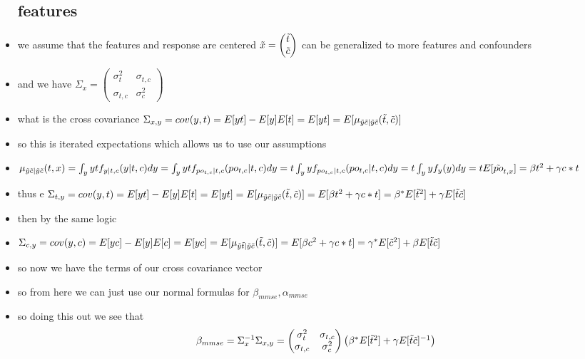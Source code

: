 \documentclass{article}
\begin{document}
\begin{itemize}
\subsection*{features}
\item we assume that the features and response are centered $\Tilde{x}=\begin{pmatrix}
    \Tilde{t}\\\Tilde{c}
\end{pmatrix}$ can be generalized to more features and confounders
\item and we have $\Sigma_{x}=\begin{pmatrix}
    \sigma^2_{t} & \sigma_{t,c}\\ \sigma_{t,c} & \sigma^2_{c}
\end{pmatrix}$
\item what is the cross covariance $\Sigma_{x,y}=cov(y,t)=E[yt]-E[y]E[t]=E[yt]=E[\mu_{\Tilde{y}\Tilde{c}|\Tilde{y}\Tilde{c}}(\Tilde{t},\Tilde{c})]$
\item so this is iterated expectations which allows us to use our assumptions
\item $\mu_{\Tilde{y}\Tilde{c}|\Tilde{y}\Tilde{c}}(t,x)=\int_y ytf_{y|t,c}(y|t,c)dy=\int_y ytf_{po_{t,c}|t,c}(po_{t,c}|t,c)dy
= t\int_y yf_{po_{t,c}|t,c}(po_{t,c}|t,c)dy=t\int_y yf_{y}(y)dy=tE[\Tilde{po}_{t,x}]=\beta t^2+\gamma c*t$
\item thus e $\Sigma_{t,y}=cov(y,t)=E[yt]-E[y]E[t]=E[yt]=E[\mu_{\Tilde{y}\Tilde{c}|\Tilde{y}\Tilde{c}}(\Tilde{t},\Tilde{c})]=E[\beta t^2+\gamma c*t]=\beta^{*}E[\tilde{t}^2]+\gamma E[\tilde{t}\Tilde{c}]$
\item then by the same logic
\item $\Sigma_{c,y}=cov(y,c)=E[yc]-E[y]E[c]=E[yc]=E[\mu_{\Tilde{y}\Tilde{t}|\Tilde{y}\Tilde{c}}(\Tilde{t},\Tilde{c})]=E[\beta c^2+\gamma c*t]=\gamma^{*}E[\tilde{c}^2]+\beta E[\tilde{t}\Tilde{c}]$
\item so now we have the terms of our cross covariance vector
\item so from here we can just use our normal formulas for $\beta_{mmse}, \alpha_{mmse}$
\item so doing this out we see that $$\beta_{mmse}=\Sigma_{x}^{-1}\Sigma_{x,y}=\begin{pmatrix}
    \sigma^2_{t} & \sigma_{t,c}\\ \sigma_{t,c} & \sigma^2_{c}
\end{pmatrix}\begin{pmatrix}
    \beta^{*}E[\tilde{t}^2]+\gamma E[\tilde{t}\Tilde{c}]^{-1}\\ 

\end{pmatrix}$$
\end{itemize}
\end{document}
